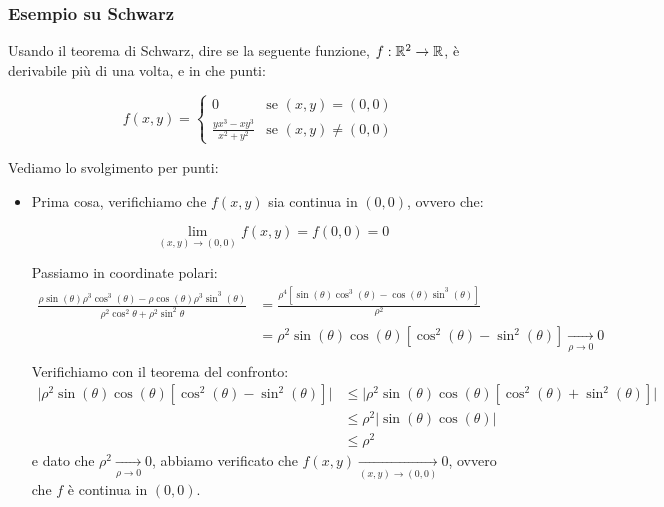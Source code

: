 \pagebreak
\subsubsection*{Esempio su Schwarz}

Usando il teorema di Schwarz, dire se la seguente funzione, \(f: \mathbb{R}^{2} \rightarrow \mathbb{R} \), è derivabile più di una volta, e in che punti:

\[
    f(x,y)=\begin{cases}
        0                                               & \text{se \((x,y) = (0,0)\)}    \\
        \displaystyle \frac{yx^{3}-xy^{3}}{x^{2}+y^{2}} & \text{se \((x,y) \neq (0,0)\)}
    \end{cases}
\]

Vediamo lo svolgimento per punti:
\begin{itemize}
    \item Prima cosa, verifichiamo che \(f(x,y)\) sia continua in \((0,0)\), ovvero che:

          \[
              \lim_{ (x,y) \to (0,0) } f(x,y)=f(0,0) = 0
          \]

          Passiamo in coordinate polari:
          \begin{align*}
              \frac{\rho\sin(\theta)\rho^3\cos^3(\theta) - \rho\cos(\theta)\rho^3\sin^3(\theta)}{\rho^2\cos^2\theta + \rho^2\sin^2\theta} & = \frac{\rho^4\left[ \sin(\theta)\cos^3(\theta) - \cos(\theta)\sin^3(\theta) \right]}{\rho^2}                \\
                                                                                                                                          & = \rho^2\sin(\theta)\cos(\theta) \left[ \cos^2(\theta) - \sin^2(\theta) \right] \xrightarrow[\rho \to 0]{} 0 \\
          \end{align*}
          Verifichiamo con il teorema del confronto:
          \begin{align*}
              \Big| \rho^2\sin(\theta)\cos(\theta) \left[ \cos^2(\theta) - \sin^2(\theta) \right] \Big| & \le \Big| \rho^2\sin(\theta)\cos(\theta) \left[ \cos^2(\theta) + \sin^2(\theta) \right] \Big| \\
                                                                                                        & \le \rho^2 \Big| \sin(\theta)\cos(\theta) \Big|                                               \\
                                                                                                        & \le \rho^2
          \end{align*}
          e dato che \(\rho^2 \xrightarrow[\rho \to 0]{} 0\), abbiamo verificato che \(f(x,y) \xrightarrow[(x,y) \to (0,0)]{} 0\), ovvero che \(f\) è continua in \((0,0)\).


\end{itemize}
